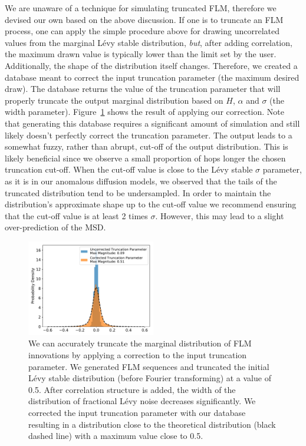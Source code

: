 \documentclass{article}
\begin{document}
  We are unaware of a technique for simulating truncated FLM, therefore we devised our
  own based on the above discussion. If one is to truncate an FLM process, one can apply
  the simple procedure above for drawing uncorrelated values from the marginal L\'evy 
  stable distribution, \textit{but}, after adding correlation, the maximum drawn value is typically lower than the limit set 
  by the user. Additionally, the shape of the distribution itself changes. Therefore, 
  we created a database meant to correct the input truncation parameter (the maximum desired draw). The database
  returns the value of the truncation parameter that will properly truncate the
  output marginal distribution based on $H$, $\alpha$ and $\sigma$ (the width parameter).
  Figure~\ref{fig:truncation_correction} shows the result of applying our correction.
  Note that generating this database requires a significant amount of simulation and
  still likely doesn't perfectly correct the truncation parameter. The output leads
  to a somewhat fuzzy, rather than abrupt, cut-off of the output distribution. This 
  is likely beneficial since we observe a small proportion of hops longer the chosen
  truncation cut-off. When the cut-off value is close to the L\'evy stable $\sigma$ parameter,
  as it is in our anomalous diffusion models, we observed that the tails of the 
  truncated distribution tend to be undersampled. In order to maintain the distribution's 
  approximate shape up to the cut-off value we recommend ensuring that the cut-off
  value is at least 2 times $\sigma$. However, this may lead to a slight over-prediction
  of the MSD.
  
  \begin{figure}
  \centering
  \includegraphics[width=0.5\textwidth]{truncation_correction.pdf}
  \caption{We can accurately truncate the marginal distribution of FLM innovations by
  applying a correction to the input truncation parameter. We generated FLM sequences
  and truncated the initial L\'evy stable distribution (before Fourier transforming) at 
  a value of 0.5. After correlation structure is added, the width of the distribution 
  of fractional L\'evy noise decreases significantly. We corrected the input truncation
  parameter with our database resulting in a distribution close to the theoretical
  distribution (black dashed line) with a maximum value close to 0.5.}\label{fig:truncation_correction}
  \end{figure}
  
\end{document}
